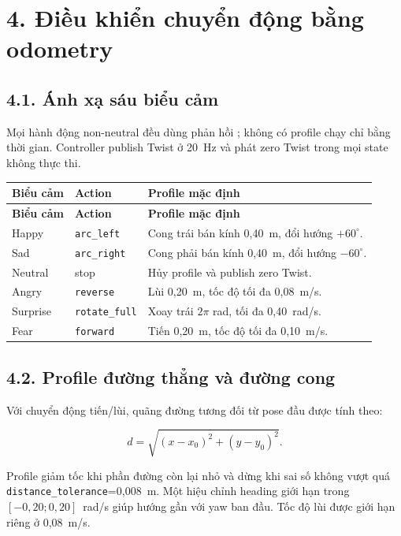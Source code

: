 \clearpage
\section*{4. Điều khiển chuyển động bằng odometry}

\subsection*{4.1. Ánh xạ sáu biểu cảm}

Mọi hành động non-neutral đều dùng phản hồi ; không có profile chạy
chỉ bằng thời gian. Controller publish Twist ở 20~Hz và phát zero Twist trong
mọi state không thực thi.

\begin{longtable}{@{}p{}p{}p{}@{}}
\toprule
\textbf{Biểu cảm} & \textbf{Action} & \textbf{Profile mặc định} \\ \midrule
\endfirsthead
\toprule \textbf{Biểu cảm} & \textbf{Action} & \textbf{Profile mặc định} \\ \midrule
\endhead
Happy & \texttt{arc\_left} & Cong trái bán kính 0,40~m, đổi hướng $+60^\circ$. \\
Sad & \texttt{arc\_right} & Cong phải bán kính 0,40~m, đổi hướng $-60^\circ$. \\
Neutral & stop & Hủy profile và publish zero Twist. \\
Angry & \texttt{reverse} & Lùi 0,20~m, tốc độ tối đa 0,08~m/s. \\
Surprise & \texttt{rotate\_full} & Xoay trái $2\pi$ rad, tối đa 0,40~rad/s. \\
Fear & \texttt{forward} & Tiến 0,20~m, tốc độ tối đa 0,10~m/s. \\
\bottomrule
\end{longtable}

\subsection*{4.2. Profile đường thẳng và đường cong}

Với chuyển động tiến/lùi, quãng đường tương đối từ pose đầu được tính theo:

\begin{equation}
  d = \sqrt{(x-x_0)^2 + (y-y_0)^2}.
\end{equation}

Profile giảm tốc khi phần đường còn lại nhỏ và dừng khi sai số không vượt quá
\texttt{distance\_tolerance}=0,008~m. Một hiệu chỉnh heading giới hạn trong
$[-0,20;0,20]$~rad/s giúp hướng gần với yaw ban đầu. Tốc độ lùi được giới hạn
riêng ở 0,08~m/s.

